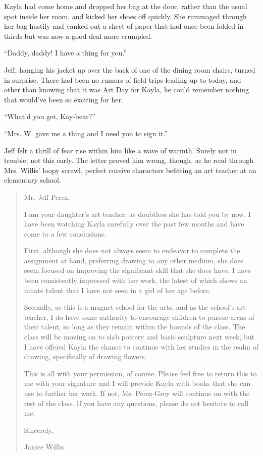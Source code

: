 Kayla had come home and dropped her bag at the door, rather than the usual spot inside her room, and kicked her shoes off quickly.  She rummaged through her bag hastily and yanked out a sheet of paper that had once been folded in thirds but was now a good deal more crumpled.

``Daddy, daddy! I have a thing for you.''

Jeff, hanging his jacket up over the back of one of the dining room chairs, turned in surprise.  There had been no rumors of field trips leading up to today, and other than knowing that it was Art Day for Kayla, he could remember nothing that would've been so exciting for her.

``What'd you get, Kay-bear?''

``Mrs. W. gave me a thing and I need you to sign it.''

Jeff felt a thrill of fear rise within him like a wave of warmth.  Surely not in trouble, not this early.  The letter proved him wrong, though, as he read through Mrs. Willis' loopy scrawl, perfect cursive characters befitting an art teacher at an elementary school.

\begin{quotation}
  Mr. Jeff Perez,

  I am your daughter's art teacher, as doubtless she has told you by now.  I have been watching Kayla carefully over the past few months and have come to a few conclusions.

  First, although she does not always seem to endeavor to complete the assignment at hand, preferring drawing to any other medium, she does seem focused on improving the significant skill that she does have.  I have been consistently impressed with her work, the latest of which shows an innate talent that I have not seen in a girl of her age before.

  Secondly, as this is a magnet school for the arts, and as the school's art teacher, I do have some authority to encourage children to pursue areas of their talent, so long as they remain within the bounds of the class.  The class will be moving on to slab pottery and basic sculpture next week, but I have offered Kayla the chance to continue with her studies in the realm of drawing, specifically of drawing flowers.

  This is all with your permission, of course.  Please feel free to return this to me with your signature and I will provide Kayla with books that she can use to further her work.  If not, Ms. Perez-Grey will continue on with the rest of the class.  If you have any questions, please do not hesitate to call me.

  Sincerely,

  Janice Willis
\end{quotation}

